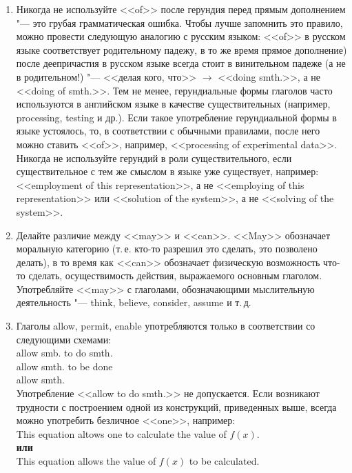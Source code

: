 \documentclass[a5paper, 10pt, twoside, numbers=enddot]{scrartcl}
\begin{document}
\begin{enumerate}
  \item Никогда не используйте <<of>> после герундия перед прямым дополнением "--- это грубая грамматическая ошибка. Чтобы лучше запомнить это правило, можно провести следующую аналогию с русским языком: <<of>> в русском языке соответствует родительному падежу, в то же время прямое дополнение) после деепричастия в русском языке всегда стоит в винительном падеже (а не в родительном!) "--- <<делая кого, что>> $\rightarrow$ <<doing smth.>>, а не <<doing of smth.>>. Тем не менее, герундиальные формы глаголов часто используются в английском языке в качестве существительных (например, processing, testing и др.). Если такое употребление герундиальной формы в языке устоялось, то, в  соответствии с обычными правилами, после него можно ставить <<of>>, например, <<processing of experimental data>>.\\ [4pt]
  Никогда не используйте герундий в роли существительного, если существительное с тем же смыслом в языке уже существует, например: <<employment of this representation>>, а не <<employing of this representation>> или <<solution of the system>>, а не <<solving of the system>>. 
  
  \item Делайте различие между <<may>> и <<can>>. <<May>> обозначает моральную категорию (т.\,е. кто-то разрешил это сделать, это позволено делать), в то время как <<can>> обозначает физическую возможность что-то сделать, осуществимость действия, выражаемого основным глаголом. Употребляйте <<may>> с глаголами, обозначающими мыслительную деятельность "--- think, believe, consider, assume и т.\,д.
  
  \item Глаголы allow, permit, enable употребляются только в соответствии со  следующими схемами:\\ [4pt] \textsf{
  allow smb. to do smth.\\
  allow smth. to be done\\
  allow smth.\\ [4pt]}
  Употребление <<allow to do smth.>> не допускается. Если возникают трудности с построением одной из конструкций, приведенных выше, всегда можно употребить безличное <<one>>, например:\\ [4pt] \textsf{
  This equation altows one to calculate the value of $f(x)$.\\ [4pt]
  \textbf{или}\\ [4pt]
  This equation allows the value of $f(x)$ to be calculated.}
  

\end{enumerate}
\end{document}
